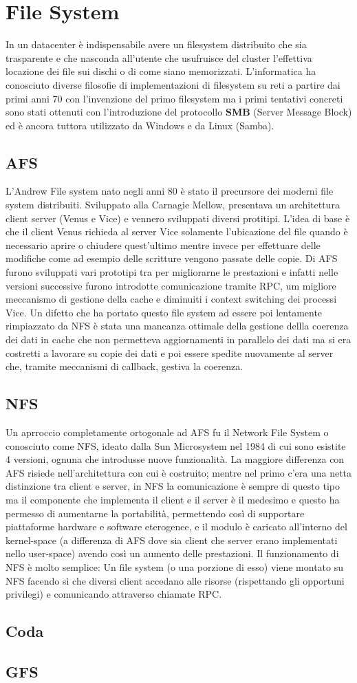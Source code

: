 \section{File System} 
In un datacenter è indispensabile avere un filesystem distribuito che sia trasparente e che nasconda all'utente che usufruisce del cluster l'effettiva locazione dei file sui dischi o di come siano memorizzati. L'informatica ha conosciuto diverse filosofie di implementazioni di filesystem su reti a partire dai primi anni 70 con l'invenzione del primo filesystem ma i primi tentativi concreti sono stati ottenuti con l'introduzione del protocollo \textbf{SMB} (Server Message Block) ed è ancora tuttora utilizzato da Windows e da Linux (Samba).
\subsection{AFS}
L'Andrew File system nato negli anni 80 è stato il precursore dei moderni file system distribuiti. Sviluppato alla Carnagie Mellow, presentava un architettura client server (Venus e Vice) e vennero sviluppati diversi protitipi. L'idea di base è che il client Venus richieda al server Vice solamente l'ubicazione del file quando è necessario aprire o chiudere quest'ultimo mentre invece per effettuare delle modifiche come ad esempio delle scritture vengono passate delle copie. Di AFS furono sviluppati vari prototipi tra per migliorarne le prestazioni e infatti nelle versioni successive furono introdotte comunicazione tramite RPC, um migliore meccanismo di gestione della cache e diminuiti i context switching dei processi Vice. Un difetto che ha portato questo file system ad essere poi lentamente rimpiazzato da NFS è stata una mancanza ottimale della gestione dellla coerenza dei dati in cache che non permetteva aggiornamenti in parallelo dei dati ma si era costretti a lavorare su copie dei dati e poi essere spedite nuovamente al server che, tramite meccanismi di callback, gestiva la coerenza.
\subsection{NFS}
Un aprroccio completamente ortogonale ad AFS fu il Network File System o conosciuto come NFS, ideato dalla Sun Microsystem nel 1984 di cui sono esistite 4 versioni, ognuna che introdusse nuove funzionalità. La maggiore differenza con AFS risiede nell'architettura con cui è costruito; mentre nel primo c'era una netta distinzione tra client e server, in NFS la comunicazione è sempre di questo tipo ma il componente che implementa il client e il server è il medesimo e questo ha permesso di aumentarne la portabilità, permettendo così di supportare piattaforme hardware e software eterogenee, e il modulo è caricato all'interno del kernel-space (a differenza di AFS dove sia client che server erano implementati nello user-space) avendo così un aumento delle prestazioni. Il funzionamento di NFS è molto semplice: Un file system (o una porzione di esso) viene montato su NFS facendo sì che diversi client accedano alle risorse (rispettando gli opportuni privilegi) e comunicando attraverso chiamate RPC.
\subsection{Coda}

\subsection{GFS}
